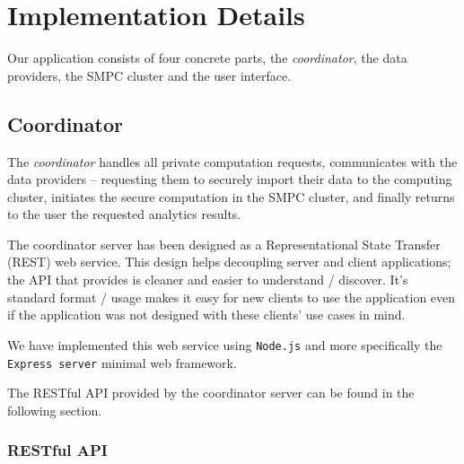 \chapter{Implementation Details}\label{c:implementation}

Our application consists of four concrete parts, the \textit{coordinator}, the data providers, the SMPC cluster and the user interface.

\section{Coordinator}\label{s:impl-coordinator}
The \textit{coordinator} handles all private computation requests, communicates with the data providers -- requesting them to securely import their data to the computing cluster, initiates the secure computation in the SMPC cluster, and finally returns to the user the requested analytics results.

The coordinator server has been designed as a Representational State Transfer (REST) web service.
This design helps decoupling server and client applications; the API that provides is cleaner and easier to understand / discover.
It's standard format / usage makes it easy for new clients to use the application even if the application was not designed with these clients' use cases in mind.

We have implemented this web service using \texttt{Node.js} and more specifically the \texttt{Express server} minimal web framework.

The RESTful API provided by the coordinator server can be found in the following section.


\subsection{RESTful API}\label{ss:coord-restful-api}

